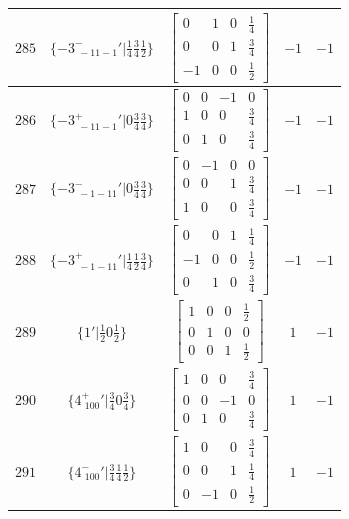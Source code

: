 \documentclass[fleqn,8pt]{jsarticle}
\begin{document}
\begin{longtable}{ccccc}
$ 285 $ & $ \{-3^{-}_{\,\,-11-1}{}'|\frac{1}{4} \frac{3}{4} \frac{1}{2}\} $ & $ \begin{bmatrix} 0 & 1 & 0 & \frac{1}{4} \\ 0 & 0 & 1 & \frac{3}{4} \\ -1 & 0 & 0 & \frac{1}{2} \end{bmatrix} $ & $ -1 $ & $ -1 $ \\ \hline
$ 286 $ & $ \{-3^{+}_{\,\,-11-1}{}'|0 \frac{3}{4} \frac{3}{4}\} $ & $ \begin{bmatrix} 0 & 0 & -1 & 0 \\ 1 & 0 & 0 & \frac{3}{4} \\ 0 & 1 & 0 & \frac{3}{4} \end{bmatrix} $ & $ -1 $ & $ -1 $ \\ \hline
$ 287 $ & $ \{-3^{-}_{\,\,-1-11}{}'|0 \frac{3}{4} \frac{3}{4}\} $ & $ \begin{bmatrix} 0 & -1 & 0 & 0 \\ 0 & 0 & 1 & \frac{3}{4} \\ 1 & 0 & 0 & \frac{3}{4} \end{bmatrix} $ & $ -1 $ & $ -1 $ \\ \hline
$ 288 $ & $ \{-3^{+}_{\,\,-1-11}{}'|\frac{1}{4} \frac{1}{2} \frac{3}{4}\} $ & $ \begin{bmatrix} 0 & 0 & 1 & \frac{1}{4} \\ -1 & 0 & 0 & \frac{1}{2} \\ 0 & 1 & 0 & \frac{3}{4} \end{bmatrix} $ & $ -1 $ & $ -1 $ \\ \hline
$ 289 $ & $ \{1{}'|\frac{1}{2} 0 \frac{1}{2}\} $ & $ \begin{bmatrix} 1 & 0 & 0 & \frac{1}{2} \\ 0 & 1 & 0 & 0 \\ 0 & 0 & 1 & \frac{1}{2} \end{bmatrix} $ & $ 1 $ & $ -1 $ \\ \hline
$ 290 $ & $ \{4^{+}_{\,\,100}{}'|\frac{3}{4} 0 \frac{3}{4}\} $ & $ \begin{bmatrix} 1 & 0 & 0 & \frac{3}{4} \\ 0 & 0 & -1 & 0 \\ 0 & 1 & 0 & \frac{3}{4} \end{bmatrix} $ & $ 1 $ & $ -1 $ \\ \hline
$ 291 $ & $ \{4^{-}_{\,\,100}{}'|\frac{3}{4} \frac{1}{4} \frac{1}{2}\} $ & $ \begin{bmatrix} 1 & 0 & 0 & \frac{3}{4} \\ 0 & 0 & 1 & \frac{1}{4} \\ 0 & -1 & 0 & \frac{1}{2} \end{bmatrix} $ & $ 1 $ & $ -1 $ \\ \hline

\end{longtable}
\end{document}
